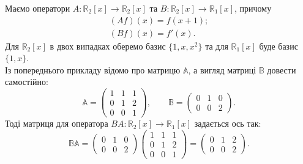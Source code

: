 \documentclass{math_library}
\begin{document}
	\begin{example}
	Маємо оператори $A \colon \mathbb{R}_2[x] \to \mathbb{R}_2[x]$ та $B \colon \mathbb{R}_2[x] \to \mathbb{R}_1[x]$, причому
	\begin{align*}
	(Af)(x) = f(x+1); \\
	(Bf)(x) = f'(x).
	\end{align*}
	Для $\mathbb{R}_2[x]$ в двох випадках оберемо базис $\{1,x,x^2\}$ та для $\mathbb{R}_1[x]$ буде базис $\{1,x\}$.\\
	Із попереднього прикладу відомо про матрицю $\mathbb{A}$, а вигляд матриці $\mathbb{B}$ довести самостійно: 
	\[
	\mathbb{A} = \begin{pmatrix}
	1 & 1 & 1 \\
	0 & 1 & 2 \\
	0 & 0 & 1
	\end{pmatrix}, \qquad \mathbb{B} = \begin{pmatrix}
	0 & 1 & 0 \\
	0 & 0 & 2
	\end{pmatrix}.
	\]
	Тоді матриця для оператора $BA \colon \mathbb{R}_2[x] \to \mathbb{R}_1[x]$ задається ось так:
	\[
	\mathbb{B} \mathbb{A} =  \begin{pmatrix}
	0 & 1 & 0 \\
	0 & 0 & 2
	\end{pmatrix} \begin{pmatrix}
	1 & 1 & 1 \\
	0 & 1 & 2 \\
	0 & 0 & 1
	\end{pmatrix} = \begin{pmatrix}
	0 & 1 & 2 \\
	0 & 0 & 2
	\end{pmatrix}.
	\]
	\end{example}	
\end{document}
